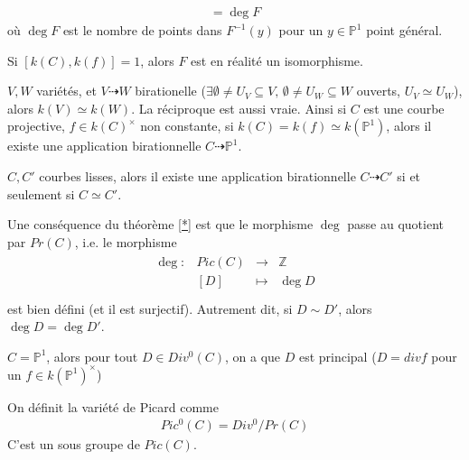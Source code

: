         \begin{theo}
            \label{***}
            \begin{align*}
                [k(C), k(f)] = \deg F
            \end{align*}
            où $\deg F$ est le nombre de points dans $F^{-1}(y)$ pour un $y \in \mathbb{P}^1$ point général.
        \end{theo}
        \begin{remq}
            Si $[k(C),k(f)] = 1$, alors $F$ est en réalité un isomorphisme.
        \end{remq}
        \begin{remq}
            $V,W$ variétés, et $V \dashrightarrow W$ birationelle ($\exists \emptyset \neq U_V \subseteq V,\, \emptyset \neq U_W \subseteq W$ ouverts, $U_V \simeq U_W$), alors $k(V) \simeq k(W)$. La réciproque est aussi vraie. Ainsi si $C$ est une courbe projective, $f \in k(C)^\times$ non constante, si $k(C) = k(f) \simeq k(\mathbb{P}^1)$, alors il existe une application birationnelle $C \dashrightarrow \mathbb{P}^1$.
        \end{remq}
        \begin{exo}
            $C,C'$ courbes lisses, alors il existe une application birationnelle $C \dashrightarrow C'$ si et seulement si $C \simeq C'$.
        \end{exo}
        Une conséquence du théorème \ref{*} est que le morphisme $\deg$ passe au quotient par $Pr(C)$, i.e. le morphisme
        \begin{align*}
            \begin{array}{cccc}
                \deg : & Pic(C) & \to & \mathbb{Z} \\
                & [D] & \mapsto & \deg D\\
            \end{array}
        \end{align*}
        est bien défini (et il est surjectif). Autrement dit, si $D \sim D'$, alors $\deg D = \deg D'$.
        \begin{exo}
            $C = \mathbb{P}^1$, alors pour tout $D \in Div^0(C)$, on a que $D$ est principal ($D = div f$ pour un $f \in k(\mathbb{P}^1)^\times$)
        \end{exo}
        \begin{defi}
            On définit la variété de Picard comme
            \begin{align*}
                Pic^0(C) = Div^0/Pr(C)
            \end{align*}
            C'est un sous groupe de $Pic(C)$.
        \end{defi}
